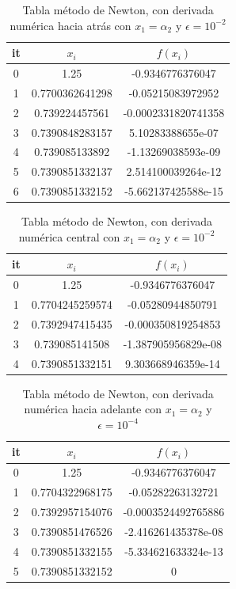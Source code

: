 \documentclass{article} %
\begin{document}
\begin{table}[H]
\centering
\begin{tabular}{|c|c|c|}
\hline
it & $x_i$ & $f(x_i)$\\
\hline
0 & 1.25 & -0.9346776376047\\
1 & 0.7700362641298 & -0.05215083972952\\
2 & 0.739224457561 & -0.0002331820741358\\
3 & 0.7390848283157 & 5.10283388655e-07\\
4 & 0.739085133892 & -1.13269038593e-09\\
5 & 0.7390851332137 & 2.514100039264e-12\\
6 & 0.7390851332152 & -5.662137425588e-15\\
\hline
\end{tabular}
\caption{Tabla método de Newton, con derivada numérica hacia atrás con $x_1 = \alpha_2$ y $\epsilon = 10^{-2}$}
\end{table}

\begin{table}[H]
\centering
\begin{tabular}{|c|c|c|}
\hline
it & $x_i$ & $f(x_i)$\\
\hline
0 & 1.25 & -0.9346776376047\\
1 & 0.7704245259574 & -0.05280944850791\\
2 & 0.7392947415435 & -0.000350819254853\\
3 & 0.739085141508 & -1.387905956829e-08\\
4 & 0.7390851332151 & 9.303668946359e-14\\
\hline
\end{tabular}
\caption{Tabla método de Newton, con derivada numérica central con $x_1 = \alpha_2$ y $\epsilon = 10^{-2}$}
\end{table}

\begin{table}[H]
\centering
\begin{tabular}{|c|c|c|}
\hline
it & $x_i$ & $f(x_i)$\\
\hline
0 & 1.25 & -0.9346776376047\\
1 & 0.7704322968175 & -0.05282263132721\\
2 & 0.7392957154076 & -0.0003524492765886\\
3 & 0.7390851476526 & -2.416261435378e-08\\
4 & 0.7390851332155 & -5.334621633324e-13\\
5 & 0.7390851332152 & 0\\
\hline
\end{tabular}
\caption{Tabla método de Newton, con derivada numérica hacia adelante con $x_1 = \alpha_2$ y $\epsilon = 10^{-4}$}
\end{table}
\end{document}
